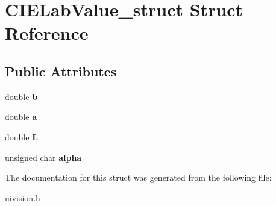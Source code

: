 \hypertarget{structCIELabValue__struct}{
\section{CIELabValue\_\-struct Struct Reference}
\label{structCIELabValue__struct}
}
\subsection*{Public Attributes}
\begin{DoxyCompactItemize}
\item 
\hypertarget{structCIELabValue__struct_a90f6724d38b9f85bb78fe8a0e92f4ac6}{
double {\bfseries b}}
\label{structCIELabValue__struct_a90f6724d38b9f85bb78fe8a0e92f4ac6}

\item 
\hypertarget{structCIELabValue__struct_a7e22c73587998981a6ef55d44adec341}{
double {\bfseries a}}
\label{structCIELabValue__struct_a7e22c73587998981a6ef55d44adec341}

\item 
\hypertarget{structCIELabValue__struct_af730eb61f988c231e877d3ca4dd6aabe}{
double {\bfseries L}}
\label{structCIELabValue__struct_af730eb61f988c231e877d3ca4dd6aabe}

\item 
\hypertarget{structCIELabValue__struct_a2ba5652f9d79e1da8a35296aad2554fa}{
unsigned char {\bfseries alpha}}
\label{structCIELabValue__struct_a2ba5652f9d79e1da8a35296aad2554fa}

\end{DoxyCompactItemize}


The documentation for this struct was generated from the following file:\begin{DoxyCompactItemize}
\item 
nivision.h\end{DoxyCompactItemize}
